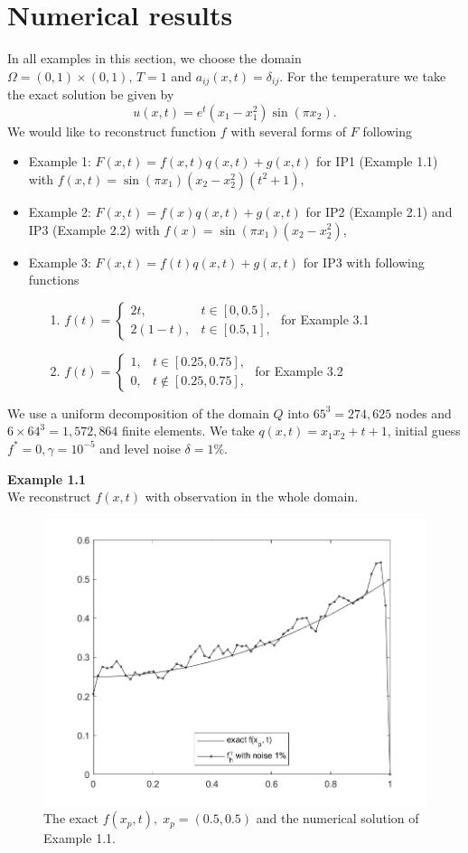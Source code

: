 \documentclass[]{article}
\begin{document}
\section{Numerical results}
In all examples in this section, we choose the domain $\Omega=(0, 1)\times(0, 1),\, T=1$ and $a_{ij}(x, t)=\delta_{ij}$.
For the temperature we take the exact solution be given by
$$u(x, t)=e^t(x_1-x_1^2)\sin(\pi x_2).$$
We would like to reconstruct function $f$ with several forms of $F$ following
\begin{itemize}
	\item Example 1: $F(x, t)=f(x, t)q(x, t)+g(x, t)$ for IP1 (Example 1.1) with $f(x, t)=\sin(\pi x_1)(x_2-x_2^2)(t^2+1)$,
	\item Example 2: $F(x, t)=f(x)q(x, t)+g(x, t)$ for IP2 (Example 2.1) and IP3 (Example 2.2) with $f(x)=\sin(\pi x_1)(x_2-x_2^2)$,
	\item Example 3: $F(x, t)=f(t)q(x, t)+g(x, t)$ for IP3 with following functions
	\begin{itemize}
		\item[1.]$f(t)=
			\begin{cases}
			2t, & t\in [0, 0.5],\\
			2(1-t), & t \in [0.5, 1],
			\end{cases}$ \qquad for Example 3.1
 		\item[2.] $f(t)=
		\begin{cases}
		1, & t\in [0.25, 0.75],\\
		0, & t \notin [0.25, 0.75],
		\end{cases}$ \qquad for Example 3.2
	\end{itemize}
\end{itemize}
We use a uniform decomposition of the domain $Q$ into $65^3=274,625$ nodes and $6\times 64^3=1,572,864$ finite elements. We take $q(x, t)=x_1x_2+t+1$, initial guess $f^*=0, \gamma=10^{-5}$ and level noise $\delta =1\%$.

\newpage
\noindent\textbf{Example 1.1}
\\
We reconstruct $f(x, t)$ with observation in the whole domain.
\begin{figure}[h!]
	\centering
	\includegraphics[width=.5\linewidth]{../Csharp/Results/HS_Q_fxt}
	\caption{The exact $f(x_p, t),\; x_p=(0.5, 0.5)$ and the numerical solution of Example 1.1.}
\end{figure}
\end{document}
